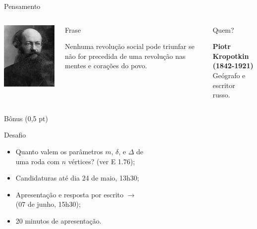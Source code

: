 \documentclass[xcolor=dvipsnames,table]{beamer}
\begin{document}
	\begin{frame}{Pensamento}
		\begin{columns}
		  		\begin{center}
		    		\includegraphics[height=.6\textheight]{images/kropotkin.jpg}
		  		\end{center}
				\begin{block}{Frase}
					\begin{center}
						{\large Nenhuma revolução social pode triunfar se não for precedida de uma revolução nas mentes e corações do povo.}
					\end{center}
				\end{block}		  		
		  		\begin{block}{Quem?}
		  			\begin{center}
						{\bf Piotr Kropotkin (1842-1921)} \\Geógrafo e escritor russo.
					\end{center}
				\end{block}
		\end{columns}
	\end{frame}
	
	\begin{frame}{Bônus (0,5 pt)}
		\begin{block}{Desafio}
			\begin{itemize}
				\item Quanto valem os parâmetros $m$, $\delta$, e $\Delta$ de \\uma roda com $n$ vértices? (ver E 1.76); 
                \item Candidaturas até dia 24 de maio, 13h30; 
                \item Apresentação e resposta por escrito $\rightarrow$ \\(07 de junho, 15h30); 
                \item 20 minutos de apresentação.
			\end{itemize}
		\end{block} 	
	\end{frame}
    
\end{document}
